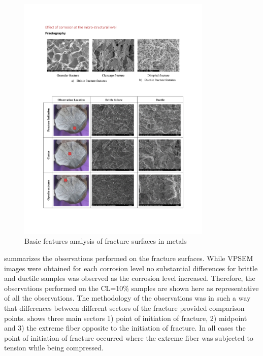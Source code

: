 \begin{figure}[htbp]
	\centering
	\includegraphics[width=0.825\textwidth]{VAC Thesis 2.0/Chapter-4/figs/FractographyBasics_101.pdf}
	\caption{Basic features analysis of fracture surfaces in metals}
	\label{fig:fractography101}
\end{figure}

 summarizes the observations performed on the fracture surfaces.  While VPSEM images were obtained for each corrosion level no substantial differences for brittle and ductile samples was observed as the corrosion level increased. Therefore, the observations performed on the CL=10\% samples are shown here as representative of all the observations. The methodology of the observations was in such a way that differences between different sectors of the fracture provided comparison points.  shows three main sectors 1) point of initiation of fracture, 2) midpoint and 3) the extreme fiber opposite to the initiation of fracture. In all cases the point of initiation of fracture occurred where the extreme fiber was subjected to tension while being compressed. 

